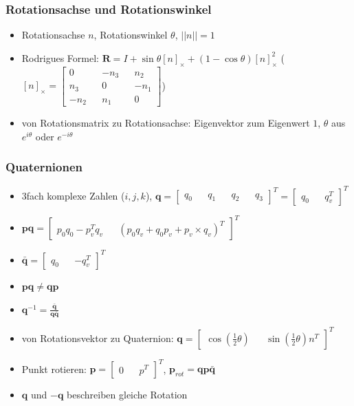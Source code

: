 \documentclass[11pt]{article}
\begin{document}
\subsubsection{Rotationsachse und Rotationswinkel}
\begin{itemize}
    \item Rotationsachse $n$, Rotationswinkel $\theta$, $||n|| = 1$
    \item Rodrigues Formel: $\boldsymbol{R} = I + \sin{\theta} [n]_{\times} + (1 - \cos{\theta}) [n]_{\times}^2$ ($[n]_{\times} = \begin{bmatrix} 0 && -n_3 && n_2 \\ n_3 && 0 && -n_1 \\ -n_2 && n_1 && 0 \end{bmatrix}$)
    \item von Rotationsmatrix zu Rotationsachse: Eigenvektor zum Eigenwert $1$, $\theta$ aus $e^{i\theta}$ oder $e^{-i\theta}$
\end{itemize}

\subsubsection{Quaternionen}
\begin{itemize}
    \item 3fach komplexe Zahlen ($i, j, k$), $\boldsymbol{q} = \begin{bmatrix} q_0 && q_1 && q_2 && q_3 \end{bmatrix}^T = \begin{bmatrix} q_0 && q_v^T \end{bmatrix}^T$
    \item $\boldsymbol{p}\boldsymbol{q} = \begin{bmatrix} p_0 q_0 - p_v^T q_v && (p_0 q_v + q_0 p_v + p_v \times q_v)^T \end{bmatrix}^T$
    \item $\boldsymbol{\bar{q}} = \begin{bmatrix} q_0 && -q_v^T \end{bmatrix}^T$
    \item $\boldsymbol{p}\boldsymbol{q} \neq \boldsymbol{q}\boldsymbol{p}$
    \item $\boldsymbol{q}^{-1} = \frac{\boldsymbol{\bar{q}}}{\boldsymbol{q}\boldsymbol{\bar{q}}}$
    \item von Rotationsvektor zu Quaternion: $\boldsymbol{q} = \begin{bmatrix} \cos{(\frac{1}{2} \theta)} && \sin{(\frac{1}{2} \theta)} n^T \end{bmatrix}^T$
    \item Punkt rotieren: $\boldsymbol{p} = \begin{bmatrix} 0 && p^T \end{bmatrix}^T$, $\boldsymbol{p}_{rot} = \boldsymbol{q}\boldsymbol{p}\boldsymbol{\bar{q}}$
    \item $\boldsymbol{q}$ und $-\boldsymbol{q}$ beschreiben gleiche Rotation
\end{itemize}
\end{document}
